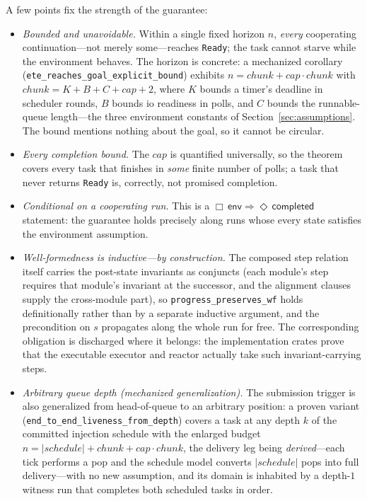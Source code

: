 \documentclass[11pt]{article}
\theoremstyle{plain}
\theoremstyle{definition}
\begin{document}
A few points fix the strength of the guarantee:
\begin{itemize}
  \item \emph{Bounded and unavoidable.} Within a single fixed horizon $n$, \emph{every}
    cooperating continuation---not merely some---reaches \texttt{Ready}; the task cannot
    starve while the environment behaves. The horizon is concrete: a mechanized corollary
    (\texttt{ete\_reaches\_goal\_explicit\_bound}) exhibits
    $n = \mathit{chunk} + \mathit{cap}\cdot\mathit{chunk}$ with
    $\mathit{chunk} = K + B + C + \mathit{cap} + 2$, where $K$ bounds a timer's deadline in
    scheduler rounds, $B$ bounds io readiness in polls, and $C$ bounds the runnable-queue
    length---the three environment constants of Section~\ref{sec:assumptions}. The bound
    mentions nothing about the goal, so it cannot be circular.
  \item \emph{Every completion bound.} The $\mathit{cap}$ is quantified universally, so the
    theorem covers every task that finishes in \emph{some} finite number of polls; a task
    that never returns \texttt{Ready} is, correctly, not promised completion.
  \item \emph{Conditional on a cooperating run.} This is a $\Box\,\mathsf{env}
    \Rightarrow \Diamond\,\mathsf{completed}$ statement: the guarantee holds precisely along
    runs whose every state satisfies the environment assumption.
  \item \emph{Well-formedness is inductive---by construction.} The composed step relation
    itself carries the post-state invariants as conjuncts (each module's step requires that
    module's invariant at the successor, and the alignment clauses supply the cross-module
    part), so \texttt{progress\_preserves\_wf} holds definitionally rather than by a
    separate inductive argument, and the precondition on $s$ propagates along the whole run
    for free. The corresponding obligation is discharged where it belongs: the
    implementation crates prove that the executable executor and reactor actually take such
    invariant-carrying steps.
  \item \emph{Arbitrary queue depth (mechanized generalization).} The submission trigger is
    also generalized from head-of-queue to an arbitrary position: a proven variant
    (\texttt{end\_to\_end\_liveness\_from\_depth}) covers a task at any depth $k$ of the
    committed injection schedule with the enlarged budget
    $n = |\mathit{schedule}| + \mathit{chunk} + \mathit{cap}\cdot\mathit{chunk}$, the delivery
    leg being \emph{derived}---each tick performs a pop and the schedule model converts
    $|\mathit{schedule}|$ pops into full delivery---with no new assumption, and its domain is
    inhabited by a depth-$1$ witness run that completes both scheduled tasks in order.
\end{itemize}
\end{document}
